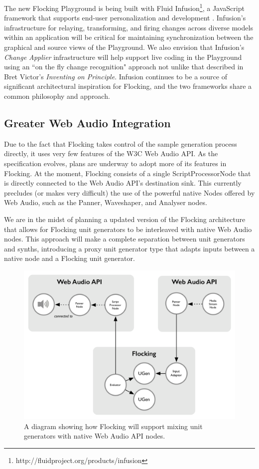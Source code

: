 \documentclass{article}
\begin{document}
The new Flocking Playground is being built with Fluid Infusion\footnote{http://fluidproject.org/products/infusion}, a JavaScript framework that supports end-user personalization and development \cite{hcii2014}. Infusion's infrastructure for relaying, transforming, and firing changes across diverse models within an application will be critical for maintaining synchronization between the graphical and source views of the Playground. We also envision that Infusion's {\it Change Applier} infrastructure will help support live coding in the Playground using an ``on the fly change recognition" approach not unlike that described in Bret Victor's {\it Inventing on Principle}\cite{victor2012inventing}. Infusion continues to be a source of significant architectural inspiration for Flocking, and the two frameworks share a common philosophy and approach.

\subsection{Greater Web Audio Integration}

Due to the fact that Flocking takes control of the sample generation process directly, it uses very few features of the W3C Web Audio API. As the specification evolves, plans are underway to adopt more of its features in Flocking. At the moment, Flocking consists of a single ScriptProcessorNode that is directly connected to the Web Audio API's destination sink. This currently precludes (or makes very difficult) the use of the powerful native Nodes offered by Web Audio, such as the Panner, Waveshaper, and Analyser nodes.

We are in the midst of planning a updated version of the Flocking architecture that allows for Flocking unit generators to be interleaved with native Web Audio nodes. This approach will make a complete separation between unit generators and synths, introducing a proxy unit generator type that adapts inputs between a native node and a Flocking unit generator.

\begin{figure}[ht]
\centering
\includegraphics[width=0.9\columnwidth]{images/flocking-web-audio-islands.png}
\caption{ A diagram showing how Flocking will support mixing unit generators with native Web Audio API nodes.\label{fig:webaudioflocking}}
\end{figure}
\end{document}

